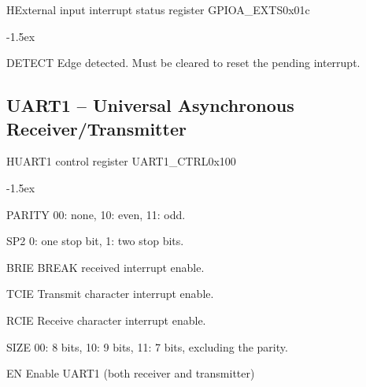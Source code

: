 \documentclass[12pt]{article}
\begin{document}
\begin{register}{H}{External input interrupt status register GPIOA\_EXTS}{0x01c}%
\label{exts}%
%
\regnewline%
\end{register}
\begin{regdesc}[0.7\textwidth]\begin{reglist}[000000]
\itemsep-1.5ex
\item[DETECT] Edge detected. Must be cleared to reset the pending interrupt.
\end{reglist}\end{regdesc}


\subsection{UART1 -- Universal Asynchronous Receiver/Transmitter}

\begin{register}{H}{UART1 control register UART1\_CTRL}{0x100}
\label{uart1ctrl}
%
%
%
%
%
%
%
%
\regnewline%
\end{register}
\begin{regdesc}[0.75\textwidth]\begin{reglist}[000000]
\itemsep-1.5ex
\item[PARITY] 00: none, 10: even, 11: odd.
\item[SP2] 0: one stop bit, 1: two stop bits.
\item[BRIE] BREAK received interrupt enable.
\item[TCIE] Transmit character interrupt enable.
\item[RCIE] Receive character interrupt enable.
\item[SIZE] 00: 8 bits, 10: 9 bits, 11: 7 bits, excluding the parity.
\item[EN] Enable UART1 (both receiver and transmitter)
\end{reglist}\end{regdesc}
\end{document}
